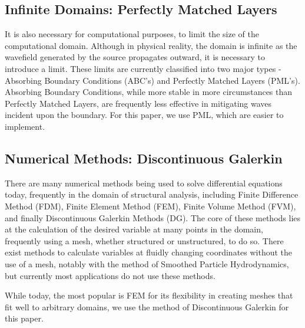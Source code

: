 \subsection{Infinite Domains: Perfectly Matched Layers}

It is also necessary for computational purposes, to limit the size of the computational domain. Although in physical reality, the domain is infinite as the wavefield generated by the source propagates outward, it is necessary to introduce a limit. These limits are currently classified into two major types - Absorbing Boundary Conditions (ABC's) and Perfectly Matched Layers (PML's). Absorbing Boundary Conditions, while more stable in more circumstances than Perfectly Matched Layers, are frequently less effective in mitigating waves incident upon the boundary. For this paper, we use PML, which are easier to implement.

\subsection{Numerical Methods: Discontinuous Galerkin}

There are many numerical methods being used to solve differential equations today, frequently in the domain of structural analysis, including Finite Difference Method (FDM), Finite Element Method (FEM), Finite Volume Method (FVM), and finally Discontinuous Galerkin Methods (DG). The core of these methods lies at the calculation of the desired variable at many points in the domain, frequently using a mesh, whether structured or unstructured, to do so. There exist methods to calculate variables at fluidly changing coordinates without the use of a mesh, notably with the method of Smoothed Particle Hydrodynamics, but currently most applications do not use these methods. 

While today, the most popular is FEM for its flexibility in creating meshes that fit well to arbitrary domains, we use the method of Discontinuous Galerkin for this paper.






